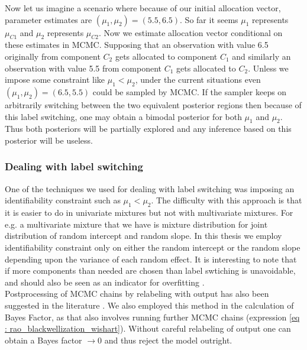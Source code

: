 Now let us imagine a scenario where because of our initial allocation vector, parameter estimates are $(\mu_1, \mu_2) = (5.5,6.5)$. So far it seems $\mu_1$ represents $\mu_{C1}$ and $\mu_2$ represents $\mu_{C2}$. Now we estimate allocation vector conditional on these estimates in MCMC. Supposing that an observation with value 6.5 originally from component $C_2$ gets allocated to component $C_1$ and similarly an observation with value 5.5 from component $C_1$ gets allocated to $C_2$. Unless we impose some constraint like $\mu_1 < \mu_2$, under the current situations even $(\mu_1,\mu_2) = (6.5, 5.5)$ could be sampled by MCMC. If the sampler keeps on arbitrarily switching between the two equivalent posterior regions then because of this label switching, one may obtain a bimodal posterior for both $\mu_1$ and $\mu_2$. Thus both posteriors will be partially explored and any inference based on this posterior will be useless.

\subsubsection{Dealing with label switching}
One of the techniques we used for dealing with label switching was imposing an identifiability constraint such as $\mu_1 < \mu_2$. The difficulty with this approach is that it is easier to do in univariate mixtures but not with multivariate mixtures. For e.g. a multivariate mixture that we have is mixture distribution for joint distribution of random intercept and random slope. In this thesis we employ identifiability constraint only on either the random intercept or the random slope depending upon the variance of each random effect. It is interesting to note that if more components than needed are chosen than label swtiching is unavoidable, and should also be seen as an indicator for overfitting \citep[pg. 104]{fruhwirth-schnatter_finite_2013}.\\

Postprocessing of MCMC chains by relabeling with output has also been suggested in the literature \citep{richardson_bayesian_1997,stephens_dealing_2000}. We also employed this method in the calculation of Bayes Factor, as that also involves running further MCMC chains (expression \ref{eq : rao_blackwellization_wishart}). Without careful relabeling of output one can obtain a Bayes factor $\to 0$ and thus reject the model outright.